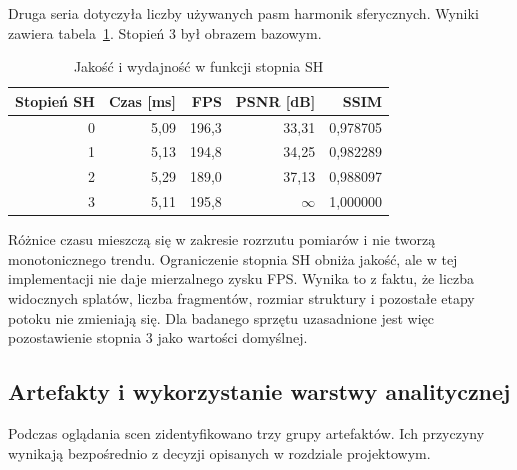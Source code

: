 Druga seria dotyczyła liczby używanych pasm harmonik sferycznych. Wyniki zawiera tabela~\ref{tab:sh_quality}. Stopień 3 był obrazem bazowym.

\begin{table}[htbp]
  \centering
  \caption{Jakość i wydajność w funkcji stopnia SH}
  \label{tab:sh_quality}
  \small
  \renewcommand{\arraystretch}{1.12}
  \begin{tabular}{rrrrr}
    \toprule
    \textbf{Stopień SH} & \textbf{Czas [ms]} & \textbf{FPS} & \textbf{PSNR [dB]} & \textbf{SSIM} \\
    \midrule
    0 & 5,09 & 196,3 & 33,31 & 0,978705 \\
    1 & 5,13 & 194,8 & 34,25 & 0,982289 \\
    2 & 5,29 & 189,0 & 37,13 & 0,988097 \\
    3 & 5,11 & 195,8 & $\infty$ & 1,000000 \\
    \bottomrule
  \end{tabular}
\end{table}

Różnice czasu mieszczą się w zakresie rozrzutu pomiarów i nie tworzą monotonicznego trendu. Ograniczenie stopnia SH obniża jakość, ale w tej implementacji nie daje mierzalnego zysku FPS. Wynika to z faktu, że liczba widocznych splatów, liczba fragmentów, rozmiar struktury i pozostałe etapy potoku nie zmieniają się. Dla badanego sprzętu uzasadnione jest więc pozostawienie stopnia 3 jako wartości domyślnej.

\subsection{Artefakty i wykorzystanie warstwy analitycznej}

Podczas oglądania scen zidentyfikowano trzy grupy artefaktów. Ich przyczyny wynikają bezpośrednio z decyzji opisanych w rozdziale projektowym.

